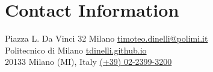 \section{\sc Contact Information}
Piazza L. Da Vinci 32 Milano \hfill \href{mailto:timoteo.dinelli@polimi.it}{timoteo.dinelli@polimi.it}\\
Politecnico di Milano   \hfill \href{https://tdinelli.github.io}{tdinelli.github.io}\\
20133 Milano (MI), Italy  \hfill \href{tel:+390223993200}{(+39) 02-2399-3200}\\
